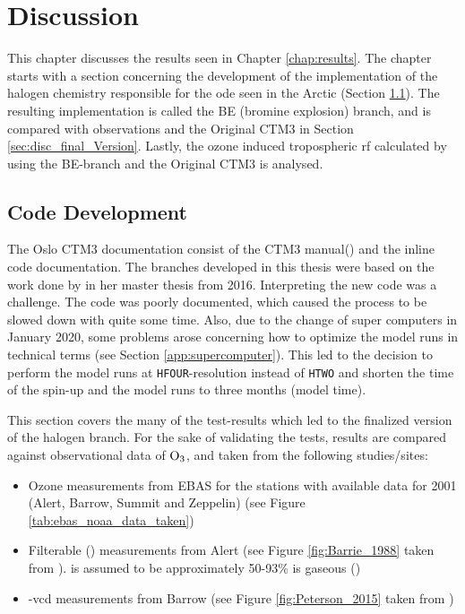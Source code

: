 \setcounter{chapter}{6}
\chapter{Discussion}\label{chap:discussion}

This chapter discusses the results seen in Chapter \ref{chap:results}. The chapter starts with a section concerning the development of the implementation of the halogen chemistry responsible for the \acrfull{ode} seen in the Arctic (Section \ref{sec:discussion_code_development}). The resulting implementation is called the BE (bromine explosion) branch, and is compared with observations and the Original CTM3 in Section \ref{sec:disc_final_Version}. Lastly, the ozone induced tropospheric \acrfull{rf} calculated by using the BE-branch and the Original CTM3 is analysed. 


\section{Code Development}\label{sec:discussion_code_development}

The Oslo CTM3 documentation consist of the CTM3 manual(\cite{SovdeManual}) and the inline code documentation. The branches developed in this thesis were based on the work done by \cite{Susanne} in her master thesis from 2016. Interpreting the new code was a challenge. The code was poorly documented, which caused the process to be slowed down with quite some time. Also, due to the change of super computers in January 2020, some problems arose concerning how to optimize the model runs in technical terms (see Section \ref{app:supercomputer}). This led to the decision to perform the model runs at \texttt{HFOUR}-resolution instead of \texttt{HTWO} and shorten the time of the spin-up and the model runs to three months (model time). 

\medskip

This section covers the many of the test-results which led to the finalized version of the halogen branch. For the sake of validating the tests, results are compared against observational data of $\mathrm{O_3}$,  and  taken from the following studies/sites: 

\begin{itemize}
    \item Ozone measurements from EBAS for the stations with available data for 2001 (Alert, Barrow, Summit and Zeppelin) (see Figure \ref{tab:ebas_noaa_data_taken})
    \item Filterable  () measurements from Alert (see Figure \ref{fig:Barrie_1988} taken from \cite{barrie}).  is assumed to be approximately 50-93\% is gaseous  (\cite{barrie})
    \item {}-\acrfull{vcd} measurements from Barrow (see Figure \ref{fig:Peterson_2015} taken from \cite{Peterson2015})
\end{itemize}


